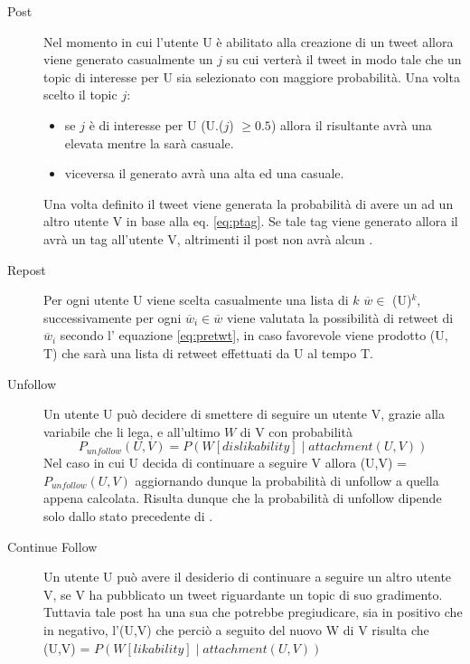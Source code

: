 \begin{description}

  \item[Post] Nel momento in cui l'utente U \`e abilitato alla 
  creazione di un tweet allora viene generato casualmente un 
  \topic{} $j$ su cui verter\`a il tweet in modo tale che un topic 
  di interesse per U sia selezionato con maggiore probabilit\`a.
  Una volta scelto il topic $j$:
  \begin{itemize}
    \item se $j$ \`e di interesse per U (U.\PI{}($j$) $\geq 0.5$)
     allora il \twt{} risultante
    avr\`a una \lika{} elevata mentre la \disla{} sar\`a casuale.
    \item viceversa il \twt{} generato avr\`a una \disla{} alta ed
    una \lika{} casuale.
  \end{itemize}
  Una volta definito il tweet viene generata la probabilit\`a di 
  avere un \dtag{} ad un altro utente V in base alla eq. 
  \ref{eq:ptag}. Se tale tag viene generato allora il \twt{} avr\`a
  un tag all'utente V, altrimenti il post non avr\`a alcun \dtag{}.
  
  \item[Repost] Per ogni utente U viene scelta casualmente una lista 
  di $k$ \twt{} $\overline{w} \in$ \FOV{}(U)$^k$, successivamente
  per ogni $\overline{w}_i \in \overline{w}$ viene valutata la 
  possibilit\`a di retweet di $\overline{w}_i$ secondo l' equazione
  \ref{eq:pretwt}, in caso favorevole viene prodotto \retwt{}(U, T) 
  che sar\`a una lista di retweet effettuati da U al tempo T.
  
  \item[Unfollow] Un utente U pu\`o decidere di smettere di seguire 
  un utente V, grazie alla variabile \attach{} che li lega, e 
  all'ultimo \twt{} $W$ di V con probabilit\`a 
  \begin{equation*}
    P_{unfollow}(U, V) = P(W[dislikability] \mid attachment(U, V))
  \end{equation*}
  Nel caso in cui U decida di continuare a seguire V allora 
  \attach{}(U,V) = $P_{unfollow}(U, V)$ aggiornando dunque la
  probabilit\`a di unfollow a quella appena calcolata.
  Risulta dunque che la probabilit\`a di unfollow dipende solo dallo 
  stato precedente di \attach{}. 
  
  \item[Continue Follow] Un utente U pu\`o avere il desiderio di 
  continuare a seguire un altro utente V, se V ha pubblicato un tweet
  riguardante un topic di suo gradimento. Tuttavia tale post ha una
  sua \lika{} che potrebbe pregiudicare, sia in positivo che in 
  negativo, l'\attach{}(U,V) che perci\`o a seguito del nuovo \twt{} 
  W di V risulta che
  \attach{}(U,V) = $P(W[likability] \mid attachment(U,V))$
  

\end{description}
